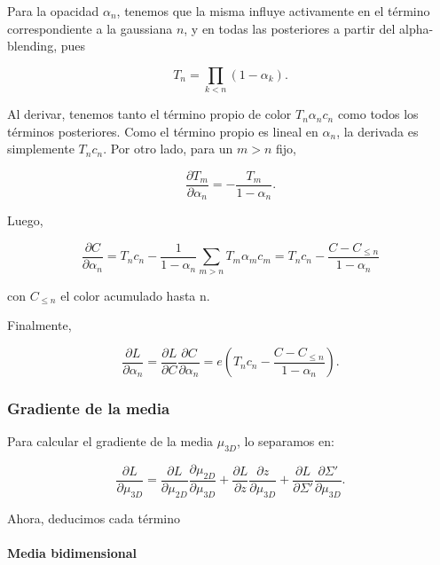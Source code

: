 Para la opacidad $\alpha_n$, tenemos que la misma influye activamente en el término correspondiente a la gaussiana $n$, y en todas las posteriores a partir del alpha-blending, pues

\begin{equation}
T_n = \prod_{k<n}(1-\alpha_k).
\end{equation}

Al derivar, tenemos tanto el término propio de color $T_n \alpha_n c_n$ como todos los términos posteriores. Como el término propio es lineal en $\alpha_n$, la derivada es simplemente $T_n c_n$. Por otro lado, para un $m>n$ fijo,

\begin{equation}
\frac{\partial T_m}{\partial \alpha_n} = - \frac{T_m}{1 - \alpha_n}.
\end{equation}

Luego,

\begin{equation}
    \frac{\partial C}{\partial \alpha_n} = T_nc_n - \frac{1}{1-\alpha_n} \sum_{m>n}T_m\alpha_mc_m
    = T_n c_n - \frac{C - C_{\leq n}}{1-\alpha_n}
\end{equation}

\noindent con $C_{\leq n}$ el color acumulado hasta n.

Finalmente,

\begin{equation}
    \frac{\partial L}{\partial \alpha_n} = 
    \frac{\partial L}{\partial C} \frac{\partial C}{\partial \alpha_n} =
    e (T_n c_n - \frac{C - C_{\leq n}}{1-\alpha_n}).
\end{equation}


\subsubsection{Gradiente de la media}

Para calcular el gradiente de la media $\mu_{3D}$, lo separamos en:

\begin{equation}
    \frac{\partial L}{\partial \mu_{3D}} =
    \frac{\partial L}{\partial \mu_{2D}} \frac{\partial \mu_{2D}}{\partial \mu_{3D}}
    + \frac{\partial L}{\partial z} \frac{\partial z}{\partial \mu_{3D}}
    + \frac{\partial L}{\partial \Sigma'} \frac{\partial \Sigma'}{\partial \mu_{3D}}.
\end{equation}

Ahora, deducimos cada término

\paragraph{Media bidimensional}

